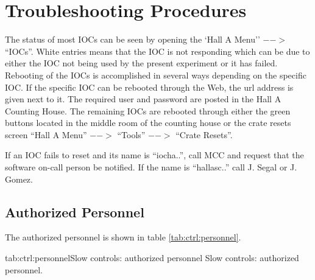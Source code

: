 {\section{Troubleshooting Procedures}
The status of most IOCs can be seen
by opening the `Hall A Menu'' $-->$ ``IOCs''. White entries means that the IOC
is not responding which can be due to either the IOC not being used by the present
experiment or it has failed. Rebooting of the IOCs is accomplished in several ways
depending on the specific IOC. If the specific IOC can be rebooted through the
Web, the url address is given next to it. The required user and password are
posted in the Hall A Counting House. The remaining IOCs are rebooted through
either the green buttons located in the middle room of the counting house
or the crate resets screen ``Hall A Menu'' $-->$ ``Tools'' $-->$ ``Crate Resets''.

If an IOC fails to reset and its name is ``iocha..'', call MCC and request that
the software on-call person be notified. If the name is ``hallasc..'' call J. Segal or J. Gomez.

} %

\infolevltone{\newpage}
\begin{safetyen}{10}{15}
\subsection{Authorized  Personnel} 
\end{safetyen}
The authorized personnel is shown in table \ref{tab:ctrl:personnel}.
\begin{namestab}{tab:ctrl:personnel}{Slow controls: authorized personnel}{%
      Slow controls: authorized personnel.}
  \JackSegal{}
  \JavierGomez{}
\end{namestab}


